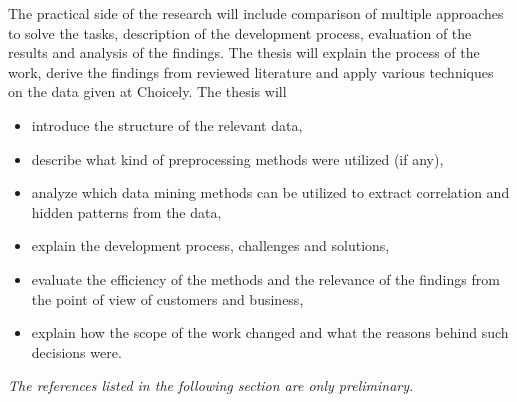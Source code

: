 \documentclass[english]{tktltiki}
\begin{document}
	\pagebreak
	The practical side of the research will include comparison of multiple approaches to solve the tasks, description of the development process, evaluation of the results and analysis of the findings. The thesis will explain the process of the work, derive the findings from reviewed literature and apply various techniques on the data given at Choicely. The thesis will  

\begin{itemize}
    \item introduce the structure of the relevant data,
    \item describe what kind of preprocessing methods were utilized (if any),
    \item analyze which data mining methods can be utilized to extract correlation and hidden patterns from the data, 
    \item explain the development process, challenges and solutions,
    \item evaluate the efficiency of the methods and the relevance of the findings from the point of view of customers and business, 
    \item explain how the scope of the work changed and what the reasons behind such decisions were.
\end{itemize}

\textit{The references listed in the following section are only preliminary.}
    
\nocite{*}



\lastpage

\appendices

\pagestyle{empty}

%
%
\end{document}
